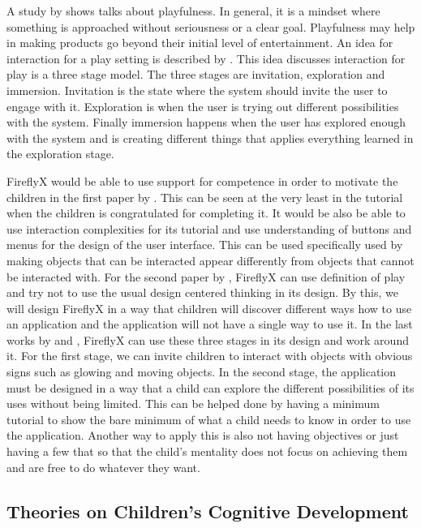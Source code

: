 A study by  shows talks about playfulness. In general, it is a mindset where something is approached without seriousness or a clear goal. Playfulness may help in making products go beyond their initial level of entertainment. An idea for interaction for a play setting is described by . This idea discusses interaction for play is a three stage model. The three stages are invitation, exploration and immersion. Invitation is the state where the system should invite the user to engage with it. Exploration is when the user is trying out different possibilities with the system. Finally immersion happens when the user has explored enough with the system and is creating different things that applies everything learned in the exploration stage.

FireflyX would be able to use support for competence in order to motivate the children in the first paper by . This can be seen at the very least in the tutorial when the children is congratulated for completing it. It would be also be able to use interaction complexities for its tutorial and use understanding of buttons and menus for the design of the user interface. This can be used specifically used by making objects that can be interacted appear differently from objects that cannot be interacted with. For the second paper by , FireflyX can use definition of play and try not to use the usual design centered thinking in its design. By this, we will design FireflyX in a way that children will discover different ways how to use an application and the application will not have a single way to use it. In the last works by  and , FireflyX can use these three stages in its design and work around it. For the first stage, we can invite children to interact with objects with obvious signs such as glowing and moving objects. In the second stage, the application must be designed in a way that a child can explore the different possibilities of its uses without being limited. This can be helped done by having a minimum tutorial to show the bare minimum of what a child needs to know in order to use the application. Another way to apply this is also not having objectives or just having a few that so that the child's mentality does not focus on achieving them and are free to do whatever they want. 

\subsection{Theories on Children's Cognitive Development}

